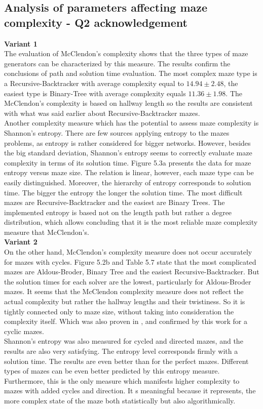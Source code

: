 \subsection{Analysis of parameters affecting maze complexity - Q2 acknowledgement}
\textbf{Variant 1}\\
\indent The evaluation of McClendon's complexity shows that the three types of maze generators can be characterized by this measure. The results confirm the conclusions
of path and solution time evaluation. The most complex maze type is a Recursive-Backtracker with average complexity equal to $14.94 \pm 2.48$, the easiest type is 
Binary-Tree with average complexity equals $11.36 \pm 1.98$. The McClendon's complexity is based on hallway length so the results are consistent with what was said earlier about
Recursive-Backtracker mazes.\\
Another complexity measure which has the potential to assess maze complexity is Shannon's entropy. There are few sources applying entropy to the mazes problems,
as entropy is rather considered for bigger networks. However, besides the big standard deviation, Shannon's entropy seems to correctly evaluate maze complexity
in terms of its solution time. Figure 5.3a presents the data for maze entropy versus maze size. The relation is linear, however, each maze type can be easily distinguished.
Moreover, the hierarchy of entropy corresponds to solution time. The bigger the entropy the longer the solution time. The most difficult mazes are Recursive-Backtracker and 
the easiest are Binary Trees. The implemented entropy is based not on the length path but rather a degree distribution, which allows concluding that it is the most reliable 
maze complexity measure that McClendon's.\\
\textbf{Variant 2}\\
On the other hand, McClendon's complexity measure does not occur accurately for mazes with cycles. Figure 5.2b and Table 5.7 state that the most
complicated mazes are Aldous-Broder, Binary Tree and the easiest Recursive-Backtracker. But the solution times for each solver are the lowest, particularly for 
Aldous-Broder mazes. It seems that the McClendon complexity measure does not reflect the actual complexity but rather the hallway lengths and their twistiness. So it
is tightly connected only to maze size, without taking into consideration the complexity itself.
Which was also proven in \cite{4}, and confirmed by this work for a cyclic mazes.\\
Shannon's entropy was also measured for cycled and directed mazes, and the results are also very satisfying. The entropy level corresponds firmly with a solution time.
The results are even better than for the perfect mazes. Different types of mazes can be even better predicted by this entropy measure.
Furthermore, this is the only measure which manifests higher complexity to mazes with added cycles and direction. It s meaningful because it represents, the 
more complex state of the maze both statistically but also algorithmically.
